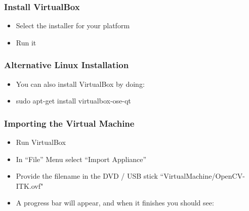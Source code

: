 \begin{frame}
\frametitle{Install VirtualBox}
\begin{itemize}
\item Select the installer for your platform
\item Run it
\end{itemize}
\end{frame}

\begin{frame}
\frametitle{Alternative Linux Installation}
\begin{itemize}
\item  You can also install VirtualBox by doing:
\item  sudo apt-get install virtualbox-ose-qt
\end{itemize}
\end{frame}

\begin{frame}
\frametitle{Importing the Virtual Machine}
\begin{itemize}
\item Run VirtualBox
\item In ``File'' Menu select ``Import Appliance''
\item Provide the filename in the DVD / USB stick ``VirtualMachine/OpenCV-ITK.ovf"
\item A progress bar will appear, and when it finishes you should see:
\end{itemize}
\begin{center}
\end{center}
\end{frame}


